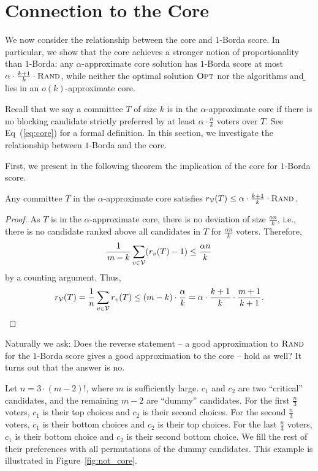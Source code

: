 \section{Connection to the Core}
\label{sec:core}
We now consider the relationship between the core and $1$-Borda score. In particular, we show that the core achieves a stronger notion of proportionality than $1$-Borda: any $\alpha$-approximate core solution has $1$-Borda score at most $\alpha \cdot \frac{k + 1}{k} \cdot {\normalfont\textsc{Rand}}$, while neither the optimal solution ${\normalfont\textsc{Opt}}$ nor the algorithms \g{} and \b{} lies in an $o(k)$-approximate core.

Recall that we say a committee $T$ of size $k$ is in the $\alpha$-approximate core if there is no blocking candidate strictly preferred by at least $\alpha \cdot \frac{n}{k}$ voters over $T$. See Eq~(\ref{eq:core}) for a formal definition. In this section, we investigate the relationship between $1$-Borda and the core.

First, we present in the following theorem the implication of the core for $1$-Borda score.

\begin{theorem}
Any committee $T$ in the $\alpha$-approximate core satisfies $r_{\mathcal{V}}(T) \leq \alpha \cdot \frac{k + 1}{k} \cdot {\normalfont\textsc{Rand}}$.
\label{thm:core_to_borda}
\end{theorem}
\begin{proof}
As $T$ is in the $\alpha$-approximate core, there is no deviation of size $\frac{\alpha n}{k}$, i.e., there is no candidate ranked above all candidates in $T$ for $\frac{\alpha n}{k}$ voters. Therefore,
\[
\frac{1}{m - k} \sum_{v \in \mathcal{V}} (r_v(T) - 1) \leq \frac{\alpha n}{k}
\]
by a counting argument. Thus,
\[
r_{\mathcal{V}}(T) = \frac{1}{n} \sum_{v \in \mathcal{V}} r_v(T) \leq (m - k) \cdot \frac{\alpha}{k} = \alpha \cdot \frac{k + 1}{k} \cdot \frac{m + 1}{k + 1}. \qedhere
\]
\end{proof}

Naturally we ask: Does the reverse statement -- a good approximation to ${\normalfont\textsc{Rand}}$ for the $1$-Borda score gives a good approximation to the core -- hold as well? It turns out that the answer is no.

\begin{example}
Let $n = 3 \cdot (m - 2)!$, where $m$ is sufficiently large. $c_1$ and $c_2$ are two ``critical'' candidates, and the remaining $m - 2$ are ``dummy'' candidates. For the first $\frac{n}{3}$ voters, $c_1$ is their top choices and $c_2$ is their second choices. For the second $\frac{n}{3}$ voters, $c_1$ is their bottom choices and $c_2$ is their top choices. For the last $\frac{n}{3}$ voters, $c_1$ is their bottom choice and $c_2$ is their second bottom choice. We fill the rest of their preferences with all permutations of the dummy candidates. This example is illustrated in Figure~\ref{fig:not_core}.
\label{ex:not_core}
\end{example}


